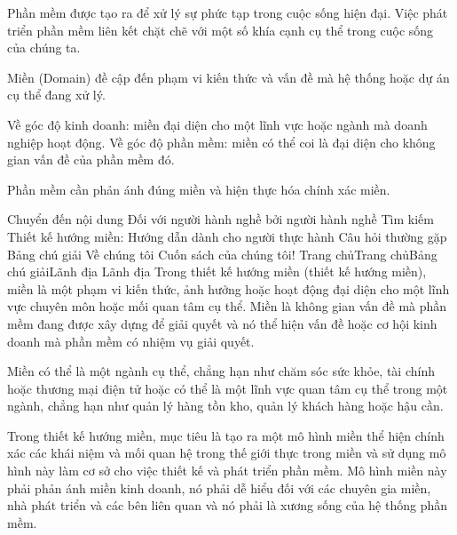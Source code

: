 
Phần mềm được tạo ra để xử lý sự phức tạp trong cuộc sống hiện đại. Việc phát triển phần mềm liên kết chặt chẽ với một số khía cạnh cụ thể trong cuộc sống của chúng ta.

Miền (Domain) đề cập đến phạm vi kiến thức và vấn đề mà hệ thống hoặc dự án cụ thể đang xử lý.

Về góc độ kinh doanh: miền đại diện cho một lĩnh vực hoặc ngành mà doanh nghiệp hoạt động.
Về góc độ phần mềm: miền có thể coi là đại diện cho không gian vấn đề của phần mềm đó.

Phần mềm cần phản ánh đúng miền và hiện thực hóa chính xác miền.




Chuyển đến nội dung
Đối với người hành nghề bởi người hành nghề
Tìm kiếm
Thiết kế hướng miền: Hướng dẫn dành cho người thực hành
Câu hỏi thường gặp
Bảng chú giải
Về chúng tôi
Cuốn sách của chúng tôi!
Trang chủTrang chủBảng chú giảiLãnh địa
Lãnh địa
Trong thiết kế hướng miền (thiết kế hướng miền), miền là một phạm vi kiến ​​thức, ảnh hưởng hoặc hoạt động đại diện cho một lĩnh vực chuyên môn hoặc mối quan tâm cụ thể. Miền là không gian vấn đề mà phần mềm đang được xây dựng để giải quyết và nó thể hiện vấn đề hoặc cơ hội kinh doanh mà phần mềm có nhiệm vụ giải quyết.

Miền có thể là một ngành cụ thể, chẳng hạn như chăm sóc sức khỏe, tài chính hoặc thương mại điện tử hoặc có thể là một lĩnh vực quan tâm cụ thể trong một ngành, chẳng hạn như quản lý hàng tồn kho, quản lý khách hàng hoặc hậu cần.

Trong thiết kế hướng miền, mục tiêu là tạo ra một mô hình miền thể hiện chính xác các khái niệm và mối quan hệ trong thế giới thực trong miền và sử dụng mô hình này làm cơ sở cho việc thiết kế và phát triển phần mềm. Mô hình miền này phải phản ánh miền kinh doanh, nó phải dễ hiểu đối với các chuyên gia miền, nhà phát triển và các bên liên quan và nó phải là xương sống của hệ thống phần mềm.


